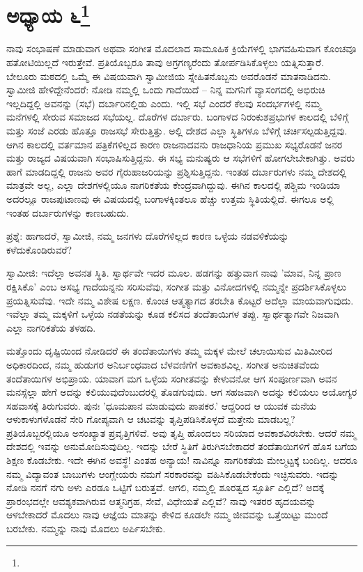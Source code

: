 \chapter{ಅಧ್ಯಾಯ ೬\protect\footnote{}}

ನಾವು ಸಂಭಾಷಣೆ ಮಾಡುವಾಗ ಅಥವಾ ಸಂಗೀತ ಮೊದಲಾದ ಸಾಮೂಹಿಕ ಕ್ರಿಯೆಗಳಲ್ಲಿ ಭಾಗವಹಿಸುವಾಗ ಕೊಂಚವೂ ಹತೋಟಿಯಿಲ್ಲದೆ ಇರುತ್ತೇವೆ. ಪ್ರತಿಯೊಬ್ಬರೂ ತಾವು ಅಗ್ರಗಣ್ಯರೆಂದು ತೋರ್ಪಡಿಸಿಕೊಳ್ಳಲು ಯತ್ನಿಸುತ್ತಾರೆ. ಬೇಲೂರು ಮಠದಲ್ಲಿ ಒಮ್ಮೆ ಈ ವಿಷಯವಾಗಿ ಸ್ವಾಮೀಜಿಯ ಸ್ನೇಹಿತನೊಬ್ಬನು ಅವರೊಡನೆ ಮಾತನಾಡಿದನು. ಸ್ವಾಮೀಜಿ ಹೇಳಿದ್ದೇನೆಂದರೆ: ನೋಡಿ ನಮ್ಮಲ್ಲಿ ಒಂದು ಗಾದೆಯಿದೆ – ನಿನ್ನ ಮಗನಿಗೆ ವ್ಯಾಸಂಗದಲ್ಲಿ ಅಭಿರುಚಿ ಇಲ್ಲದಿದ್ದಲ್ಲಿ ಅವನನ್ನು (ಸಭೆ) ದರ್ಬಾರಿನಲ್ಲಿಡು ಎಂದು. ಇಲ್ಲಿ ಸಭೆ ಎಂದರೆ ಕೆಲವು ಸಂದರ್ಭಗಳಲ್ಲಿ ನಮ್ಮ ಮನೆಗಳಲ್ಲಿ ಸೇರುವ ಸಮಾಜದ ಸಭೆಯಲ್ಲ. ದೊರೆಗಳ ದರ್ಬಾರು. ಬಂಗಾಳದ ನಿರಂಕುಶಪ್ರಭುಗಳ ಕಾಲದಲ್ಲಿ ಬೆಳಿಗ್ಗೆ ಮತ್ತು ಸಂಜೆ ಎರಡು ಹೊತ್ತೂ ರಾಜಸಭೆ ಸೇರುತ್ತಿತ್ತು. ಅಲ್ಲಿ ದೇಶದ ಎಲ್ಲಾ ಸ್ಥಿತಿಗಳೂ ಬೆಳಿಗ್ಗೆ ಚರ್ಚಿಸಲ್ಪಡುತ್ತಿದ್ದವು. ಆಗಿನ ಕಾಲದಲ್ಲಿ ವರ್ತಮಾನ ಪತ್ರಿಕೆಗಳಿಲ್ಲದ ಕಾರಣ ರಾಜನಾದವನು ರಾಜಧಾನಿಯ ಪ್ರಮುಖ ಸಭ್ಯರೊಡನೆ ಜನರ ಮತ್ತು ರಾಜ್ಯದ ವಿಷಯವಾಗಿ ಸಂಭಾಷಿಸುತ್ತಿದ್ದನು. ಈ ಸಭ್ಯ ಮನುಷ್ಯರು ಆ ಸಭೆಗಳಿಗೆ ಹೋಗಲೇಬೇಕಾಗಿತ್ತು. ಅವರು ಹಾಗೆ ಮಾಡದಿದ್ದಲ್ಲಿ ರಾಜನು ಅವರ ಗೈರುಹಾಜರಿಯನ್ನು ಪ್ರಶ್ನಿಸುತ್ತಿದ್ದನು. ಇಂತಹ ದರ್ಬಾರುಗಳು ನಮ್ಮ ದೇಶದಲ್ಲಿ ಮಾತ್ರವೇ ಅಲ್ಲ, ಎಲ್ಲಾ ದೇಶಗಳಲ್ಲಿಯೂ ನಾಗರಿಕತೆಯ ಕೇಂದ್ರವಾಗಿದ್ದುವು. ಈಗಿನ ಕಾಲದಲ್ಲಿ ಪಶ್ಚಿಮ ಇಂಡಿಯಾ ಅದರಲ್ಲೂ ರಾಜಪುಟಾಣವು ಈ ವಿಷಯದಲ್ಲಿ ಬಂಗಾಳಕ್ಕಿಂತಲೂ ಹೆಚ್ಚು ಉತ್ತಮ ಸ್ಥಿತಿಯಲ್ಲಿದೆ. ಈಗಲೂ ಅಲ್ಲಿ ಇಂತಹ ದರ್ಬಾರುಗಳನ್ನು ಕಾಣಬಹುದು.

ಪ್ರಶ್ನೆ: ಹಾಗಾದರೆ, ಸ್ವಾಮೀಜಿ, ನಮ್ಮ ಜನಗಳು ದೊರೆಗಳಿಲ್ಲದ ಕಾರಣ ಒಳ್ಳೆಯ ನಡವಳಿಕೆಯನ್ನು ಕಳೆದುಕೊಂಡಿರುವರೆ?

ಸ್ವಾಮೀಜಿ: ಇದೆಲ್ಲಾ ಅವನತ ಸ್ಥಿತಿ. ಸ್ವಾರ್ಥವೇ ಇದರ ಮೂಲ. ಹಡಗನ್ನು ಹತ್ತುವಾಗ ನಾವು 'ಮಾವ, ನಿನ್ನ ಪ್ರಾಣ ರಕ್ಷಿಸಿಕೊ' ಎಂಬ ಅಸಭ್ಯ ಗಾದೆಯನ್ನನು ಸರಿಸುವೆವು, ಸಂಗೀತ ಮತ್ತು ವಿನೋದಗಳಲ್ಲಿ ನಮ್ಮನ್ನೇ ಪ್ರದರ್ಶಿಸಿಕೊಳ್ಳಲು ಪ್ರಯತ್ನಿಸುವೆವು. ಇದೇ ನಮ್ಮ ವಿಶೇಷ ಲಕ್ಷಣ. ಕೊಂಚ ಆತ್ಮತ್ಯಾಗದ ತರಬೇತಿ ಕೊಟ್ಟರೆ ಅದೆಲ್ಲಾ ಮಾಯವಾಗುವುದು. ಇವೆಲ್ಲಾ ತಮ್ಮ ಮಕ್ಕಳಿಗೆ ಒಳ್ಳೆಯ ನಡತೆಯನ್ನು ಕೂಡ ಕಲಿಸದ ತಂದೆತಾಯಿಗಳ ತಪ್ಪು. ಸ್ವಾರ್ಥತ್ಯಾಗವೇ ನಿಜವಾಗಿ ಎಲ್ಲಾ ನಾಗರಿಕತೆಯ ತಳಹದಿ.

ಮತ್ತೊಂದು ದೃಷ್ಟಿಯಿಂದ ನೋಡಿದರೆ ಈ ತಂದೆತಾಯಿಗಳು ತಮ್ಮ ಮಕ್ಕಳ ಮೇಲೆ ಚಲಾಯಿಸುವ ಮಿತಿಮೀರಿದ ಅಧಿಕಾರದಿಂದ, ನಮ್ಮ ಹುಡುಗರ ಅನಿರ್ಬಂಧವಾದ ಬೆಳವಣಿಗೆಗೆ ಅವಕಾಶವಿಲ್ಲ. ಸಂಗೀತ ಅನುಚಿತವೆಂದು ತಂದೆತಾಯಿಗಳ ಅಭಿಪ್ರಾಯ. ಯಾವಾಗ ಮಗ ಒಳ್ಳೆಯ ಸಂಗೀತವನ್ನು ಕೇಳುವನೋ ಆಗ ಸಂಪೂರ್ಣವಾಗಿ ಅವನ ಮನಸ್ಸೆಲ್ಲಾ ಹೇಗೆ ಅದನ್ನು ಕಲಿಯುವುದೆಂಬುದರಲ್ಲಿ ತೊಡಗುವುದು. ಆಗ ಸಹಜವಾಗಿ ಅದನ್ನು ಕಲಿಯಲು ಅಯೋಗ್ಯರ ಸಹವಾಸಕ್ಕೆ ತಿರುಗುವರು. ಪುನಃ 'ಧೂಮಪಾನ ಮಾಡುವುದು ಪಾಪಕರ.' ಆದ್ದರಿಂದ ಆ ಯುವಕ ಮನೆಯ ಆಳುಕಾಳುಗಳೊಡನೆ ಸೇರಿ ಗೋಪ್ಯವಾಗಿ ಆ ಚಟವನ್ನು ತೃಪ್ತಿಪಡಿಸಿಕೊಳ್ಳದೆ ಮತ್ತೇನು ಮಾಡಬಲ್ಲ? ಪ್ರತಿಯೊಬ್ಬರಲ್ಲಿಯೂ ಅಸಂಖ್ಯಾತ ಪ್ರವೃತ್ತಿಗಳಿವೆ. ಅವು ತೃಪ್ತಿ ಹೊಂದಲು ಸರಿಯಾದ ಅವಕಾಶವಿರಬೇಕು. ಆದರೆ ನಮ್ಮ ದೇಶದಲ್ಲಿ ಇವನ್ನು ಅನುಮೋದಿಸುವುದಿಲ್ಲ. ಇದನ್ನು ಬೇರೆ ಸ್ಥಿತಿಗೆ ತಿರುಗಿಸಬೇಕಾದರೆ ತಂದೆತಾಯಿಗಳಿಗೆ ಹೊಸ ಬಗೆಯ ಶಿಕ್ಷಣ ಕೊಡಬೇಕು. ಇದೇ ಈಗಿನ ಅವಸ್ಥೆ! ಎಂತಹ ಅನ್ಯಾಯ! ನಾವಿನ್ನೂ ನಾಗರಿಕತೆಯ ಮೇಲ್ಮಟ್ಟಕ್ಕೆ ಬಂದಿಲ್ಲ. ಆದರೂ ನಮ್ಮ ವಿದ್ಯಾವಂತ ಬಾಬುಗಳು ಆಂಗ್ಲೇಯರು ನಮಗೆ ಸರಕಾರವನ್ನು ವಹಿಸಿಕೊಡಬೇಕೆಂದು ಇಚ್ಛಿಸುವರು. ಇದನ್ನು ನೋಡಿ ನನಗೆ ನಗು ಅಳು ಎರಡೂ ಒಟ್ಟಿಗೆ ಬರುತ್ತವೆ. ಆಗಲಿ, ನಮ್ಮಲ್ಲಿ ಶೂರತ್ವದ ಸ್ಫೂರ್ತಿ ಎಲ್ಲಿದೆ? ಅದಕ್ಕೆ ಪ್ರಾರಂಭದಲ್ಲೇ ಆವಶ್ಯಕವಾಗಿರುವ ಆತ್ಮನಿಗ್ರಹ, ಸೇವೆ, ವಿಧೇಯತೆ ಎಲ್ಲಿವೆ? ನಾವು ಇತರರ ಹೃದಯವನ್ನು ಆಳಬೇಕಾದರೆ ಮೊದಲು ನಾವು ಆಜ್ಞೆಯ ಮಾತನ್ನು ಕೇಳಿದ ಕೂಡಲೇ ನಮ್ಮ ಜೀವವನ್ನು ಒತ್ತೆಯಿಟ್ಟು ಮುಂದೆ ಬರಬೇಕು. ನಮ್ಮನ್ನು ನಾವು ಮೊದಲು ಅರ್ಪಿಸಬೇಕು.

